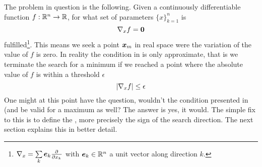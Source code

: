     The problem in question is the following. Given a continuously
    differentiable function $f:\mathbb{R}^n\rightarrow\mathbb{R}$, for what set of
    parameters $\{x\}^{n}_{k=1}$ is 
        \begin{equation}
            \nabla_{x} f = \boldsymbol{{0}}
            \label{eq:mincondition}
        \end{equation}
    fulfilled\footnote{$\nabla_{x}=\sum\limits_k\blds{e}_k\prd{x_k}$ with
    $\boldsymbol{{e}}_k\in\mathbb{R}^n$ a unit vector along direction $k$.}. This means
    we seek a point $\boldsymbol{{x}}_m$ in real space were the variation of the value
    of $f$ is zero. In reality the condition in  is only
    approximate, that is we terminate the search for a minimum if we reached a
    point where the absolute value of $f$ is within a threshold
    $\epsilon$
        \begin{equation}
            \abs{\nabla_{x} f} \leq \epsilon
            \label{eq:minconditionapprox}
        \end{equation}
    One might at this point have the question, wouldn't the condition presented
    in (and  be valid for a
    maximum as well? The answer is yes, it would. The simple fix to this is to
    define the , more precisely the sign of the search
    direction. The next section explains this in better detail.


